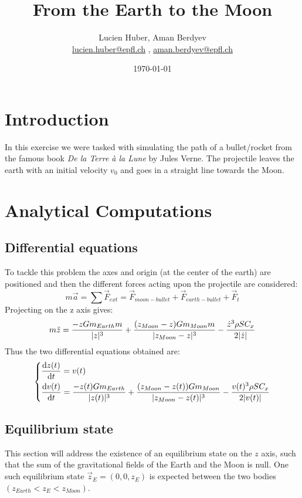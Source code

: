 \documentclass[a4paper,12pt]{article}
\def \be {\begin{equation}}
\def \ee {\end{equation}}
\def \dd {{\rm d}}
\newcommand{\mail}[1]{{\href{mailto:#1}{#1}}} %
\newcommand{\abs}[1]{\lvert#1\rvert} %
\newcommand{\zM}{z_{Moon}} %
\newcommand{\mE}{m_{Earth}} %
\newcommand{\mM}{m_{Moon}} %
\begin{document}
\title{From the Earth to the Moon}
\author{Lucien Huber, Aman Berdyev \\
{\small \mail{lucien.huber@epfl.ch} , \mail{aman.berdyev@epfl.ch}}}
\date{\today}
\maketitle

\section{Introduction}

In this exercise we were tasked with simulating the path of a bullet/rocket from the famous book \emph{De la Terre \`a la Lune} by Jules Verne. The projectile leaves the earth with an initial velocity $v_0$ and goes in a straight line towards the Moon.


\section{Analytical Computations}

\subsection{Differential equations}

To tackle this problem the axes and origin (at the center of the earth)  are positioned and then the different forces acting upon the projectile are considered:
\be
    m\vec{a} =\sum \vec{F}_{ext} =   \vec{F}_{moon-bullet} + \vec{F}_{earth-bullet}  + \vec{F}_t
\ee
Projecting on the z axis gives:
\be
 m\Ddot{z} = \frac{-z G\mE m}{\abs{z}^3} + \frac{(\zM-z)G\mM m}{\abs{\zM-z}^3} - \frac{\Dot{z}^3\rho S C_x }{ 2\abs{\Dot{z}}}
\ee
Thus the two differential equations obtained are:
\be
\begin{dcases}
    \frac{\dd z(t)}{\dd t}  = v(t) \\
    \frac{\dd v(t)}{\dd t}  = \frac{-z(t) G\mE}{\abs{z(t)}^3} + \frac{(\zM-z(t))G\mM}{\abs{\zM-z(t)}^3} - \frac{v(t)^3\rho S C_x }{ 2\abs{v(t)}}
    \label{eq:diffzv}
\end{dcases}
\ee

\subsection{Equilibrium state}
This section will address the existence of an equilibrium state on the $z$ axis, such that the sum of the gravitational fields of the Earth and the Moon is null. One such equilibrium state \( \vec{z}_E = (0, 0, z_E) \) is expected between the two bodies \( (z_{Earth} < z_E < \zM) \).
\end{document}
